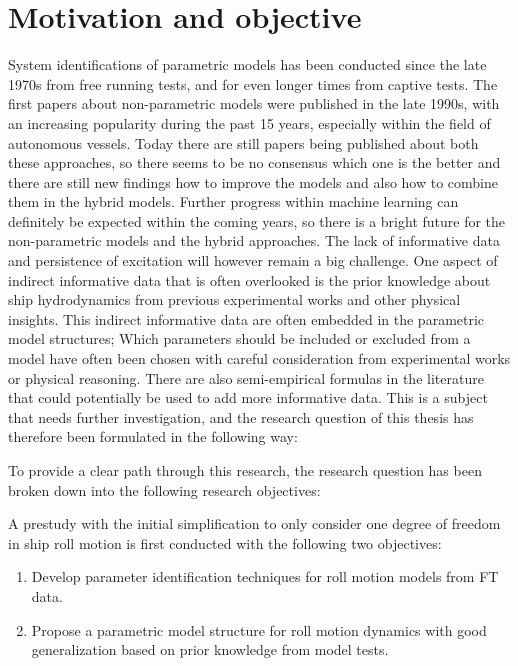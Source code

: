 \section{Motivation and objective}
\label{sec:motivation}
System identifications of parametric models has been conducted since the late 1970s from free running tests, and for even longer times from captive tests. The first papers about non-parametric models were published in the late 1990s, with an increasing popularity during the past 15 years, especially within the field of autonomous vessels. Today there are still papers being published about both these approaches, so there seems to be no consensus which one is the better and there are still new findings how to improve the models and also how to combine them in the hybrid models.
Further progress within machine learning can definitely be expected within the coming years, so there is a bright future for the non-parametric models and the hybrid approaches. The lack of informative data and persistence of excitation will however remain a big challenge. One aspect of indirect informative data that is often overlooked is the prior knowledge about ship hydrodynamics from previous experimental works and other physical insights. This indirect informative data are often embedded in the parametric model structures; Which parameters should be included or excluded from a model have often been chosen with careful consideration from experimental works or physical reasoning. There are also semi-empirical formulas in the literature that could potentially be used to add more informative data. This is a subject that needs further investigation, and the research question of this thesis has therefore been formulated in the following way: 
\begin{tcolorbox}[sharp corners,title=Research question]
    \emph{\researchquestion}
\end{tcolorbox}
To provide a clear path through this research, the research question has been broken down into the following research objectives:

\noindent A prestudy with the initial simplification to only consider one degree of freedom in ship roll motion is first conducted with the following two objectives:
\begin{enumerate}[label=(\Alph*),itemsep=1mm]

    \item Develop parameter identification techniques for roll motion models from FT data.
    
    \item Propose a parametric model structure for roll motion dynamics with good generalization based on prior knowledge from model tests. 

\end{enumerate}

